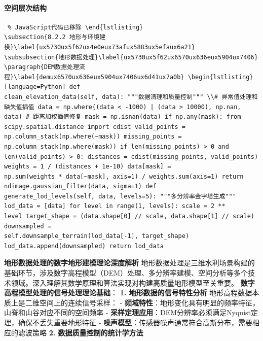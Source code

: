 \paragraph{空间层次结构}\label{ux7a7aux95f4ux5c42ux6b21ux7ed3ux6784} \begin{lstlisting} % JavaScript代码已移除 \end{lstlisting}
\subsection{8.2.2 地形与环境建模}\label{ux5730ux5f62ux4e0eux73afux5883ux5efaux6a21}
\subsubsection{地形数据处理}\label{ux5730ux5f62ux6570ux636eux5904ux7406}
\paragraph{DEM数据处理流程}\label{demux6570ux636eux5904ux7406ux6d41ux7a0b} \begin{lstlisting}[language=Python] def
clean_elevation_data(self, data): """数据清理和质量控制""" \\# 异常值处理和缺失值插值 data = np.where((data < -1000) | (data > 10000), np.nan,
data) # 距离加权插值修复 mask = np.isnan(data) if np.any(mask): from scipy.spatial.distance import cdist valid_points =
np.column_stack(np.where(~mask)) missing_points = np.column_stack(np.where(mask)) if len(missing_points) > 0 and
len(valid_points) > 0: distances = cdist(missing_points, valid_points) weights = 1 / (distances + 1e-10) data[mask] =
np.sum(weights * data[~mask], axis=1) / weights.sum(axis=1) return ndimage.gaussian_filter(data, sigma=1) def
generate_lod_levels(self, data, levels=5): """多分辨率金字塔生成""" lod_data = [data] for level in range(1, levels): scale = 2 **
level target_shape = (data.shape[0] // scale, data.shape[1] // scale) downsampled =
self.downsample_terrain(lod_data[-1], target_shape) lod_data.append(downsampled) return lod_data \end{lstlisting}
\textbf{地形数据处理的数字地形建模理论深度解析} 地形数据处理是三维水利场景构建的基础环节，涉及数字高程模型（DEM）处理、多分辨率建模、空间分析等多个技术领域。深入理解其数学原理和算法实现对构建高质量地形模型至关重要。
\textbf{数字高程模型处理的信号处理理论基础}： \textbf{1. 地形数据的信号特性分析} 地形高程数据本质上是二维空间上的连续信号采样： - \textbf{频域特性}：地形变化具有明显的频率特征，山脊和山谷对应不同的空间频率
- \textbf{采样定理应用}：DEM分辨率必须满足Nyquist定理，确保不丢失重要地形特征 - \textbf{噪声模型}：传感器噪声通常符合高斯分布，需要相应的滤波策略 \textbf{2. 数据质量控制的统计学方法}
